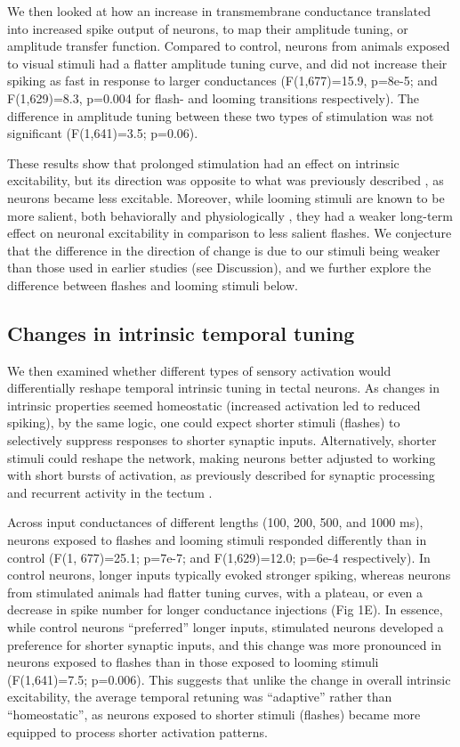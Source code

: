 \documentclass{article}
\begin{document}
We then looked at how an increase in transmembrane conductance translated into increased spike output of neurons, to map their amplitude tuning, or amplitude transfer function. Compared to control, neurons from animals exposed to visual stimuli had a flatter amplitude tuning curve, and did not increase their spiking as fast in response to larger conductances (F(1,677)=15.9, p=8e-5; and F(1,629)=8.3, p=0.004 for flash- and looming transitions respectively). The difference in amplitude tuning between these two types of stimulation was not significant (F(1,641)=3.5; p=0.06).

These results show that prolonged stimulation had an effect on intrinsic excitability, but its direction was opposite to what was previously described \citep{aizenman2003,ciarleglio2015}, as neurons became less excitable. Moreover, while looming stimuli are known to be more salient, both behaviorally and physiologically \citep{khakhalin2014}, they had a weaker long-term effect on neuronal excitability in comparison to less salient flashes. We conjecture that the difference in the direction of change is due to our stimuli being weaker than those used in earlier studies (see Discussion), and we further explore the difference between flashes and looming stimuli below.

\subsection*{Changes in intrinsic temporal tuning}

We then examined whether different types of sensory activation would differentially reshape temporal intrinsic tuning in tectal neurons. As changes in intrinsic properties seemed homeostatic (increased activation led to reduced spiking), by the same logic, one could expect shorter stimuli (flashes) to selectively suppress responses to shorter synaptic inputs. Alternatively, shorter stimuli could reshape the network, making neurons better adjusted to working with short bursts of activation, as  previously described for synaptic processing \citep{aizenman2007} and recurrent activity in the tectum \citep{pratt2007,shen2011}.

Across input conductances of different lengths (100, 200, 500, and 1000 ms), neurons exposed to flashes and looming stimuli responded differently than in control (F(1, 677)=25.1; p=7e-7; and F(1,629)=12.0; p=6e-4 respectively). In control neurons, longer inputs typically evoked stronger spiking, whereas neurons from stimulated animals had flatter tuning curves, with a plateau, or even a decrease in spike number for longer conductance injections (Fig 1E). In essence, while control neurons “preferred” longer inputs, stimulated neurons developed a preference for shorter synaptic inputs, and this change was more pronounced in neurons exposed to flashes than in those exposed to looming stimuli (F(1,641)=7.5; p=0.006). This suggests that unlike the  change in overall intrinsic excitability, the average temporal retuning was “adaptive” rather than “homeostatic”, as neurons exposed to shorter stimuli (flashes) became more equipped to process shorter activation patterns. 
\end{document}
